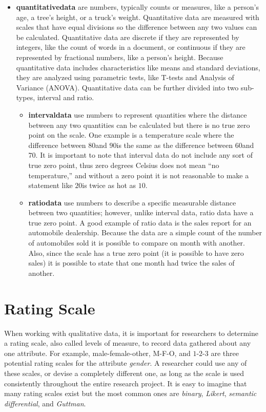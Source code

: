 \begin{itemize}
	\item \textbf{\Gls{quantitativedata}} are numbers, typically counts or measures, like a person's age, a tree's height, or a truck's weight. Quantitative data are measured with scales that have equal divisions so the difference between any two values can be calculated. Quantitative data are discrete if they are represented by integers, like the count of words in a document, or continuous if they are represented by fractional numbers, like a person's height. Because quantitative data includes characteristics like means and standard deviations, they are analyzed using parametric tests, like T-tests and Analysis of Variance (ANOVA). Quantitative data can be further divided into two sub-types, interval and ratio.
	
	\begin{itemize}
		\item \textbf{\Gls{intervaldata}} use numbers to represent quantities where the distance between any two quantities can be calculated but there is no true zero point on the scale. One example is a temperature scale where the difference between $ 80 $\textdegree and $ 90 $\textdegree is the same as the difference between $ 60 $\textdegree and $ 70 $\textdegree. It is important to note that interval data do not include any sort of true zero point, thus zero degrees Celsius does not mean ``no temperature,'' and without a zero point it is not reasonable to make a statement like $ 20 $\textdegree is twice as hot as $ 10 $\textdegree.
		
		\item \textbf{\Gls{ratiodata}} use numbers to describe a specific measurable distance between two quantities; however, unlike interval data, ratio data have a true zero point. A good example of ratio data is the sales report for an automobile dealership. Because the data are a simple count of the number of automobiles sold it is possible to compare on month with another. Also, since the scale has a true zero point (it is possible to have zero sales) it is possible to state that one month had twice the sales of another.
	\end{itemize}
\end{itemize}

\section{Rating Scale}

When working with qualitative data, it is important for researchers to determine a rating scale, also called levels of measure, to record data gathered about any one attribute. For example, male-female-other, M-F-O, and $ 1 $-$ 2 $-$ 3 $ are three potential rating scales for the attribute \textit{gender}. A researcher could use any of these scales, or devise a completely different one, as long as the scale is used consistently throughout the entire research project. It is easy to imagine that many rating scales exist but the most common ones are \textit{binary}, \textit{Likert}, \textit{semantic differential}, and \textit{Guttman}. 

